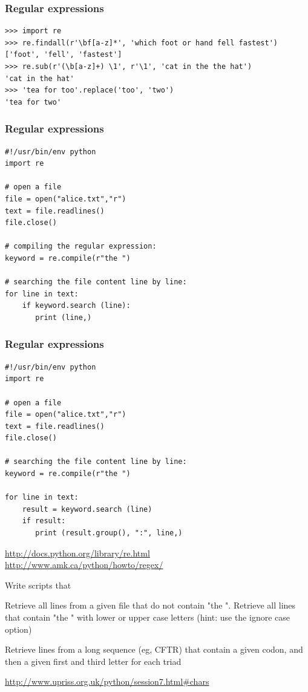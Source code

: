 \documentclass{beamer}
\begin{document}
\begin{frame}[containsverbatim]
\frametitle{Regular expressions}
\begin{lstlisting}
>>> import re
>>> re.findall(r'\bf[a-z]*', 'which foot or hand fell fastest')
['foot', 'fell', 'fastest']
>>> re.sub(r'(\b[a-z]+) \1', r'\1', 'cat in the the hat')
'cat in the hat'
>>> 'tea for too'.replace('too', 'two')
'tea for two'
\end{lstlisting}
\end{frame}


\begin{frame}[containsverbatim]
\frametitle{Regular expressions}
\begin{lstlisting}
#!/usr/bin/env python
import re

# open a file
file = open("alice.txt","r")
text = file.readlines()
file.close()

# compiling the regular expression:
keyword = re.compile(r"the ")

# searching the file content line by line:
for line in text:
    if keyword.search (line):
       print (line,)
\end{lstlisting}
\end{frame}

\begin{frame}[containsverbatim]
\frametitle{Regular expressions}
\begin{lstlisting}
#!/usr/bin/env python
import re

# open a file
file = open("alice.txt","r")
text = file.readlines()
file.close()

# searching the file content line by line:
keyword = re.compile(r"the ")

for line in text:
    result = keyword.search (line)
    if result:
       print (result.group(), ":", line,)
\end{lstlisting}
\url{http://docs.python.org/library/re.html}
\url{http://www.amk.ca/python/howto/regex/}
\end{frame}


\begin{frame}[containsverbatim]
Write scripts that
\begin{example}
Retrieve all lines from a given file that do not contain "the ". Retrieve all lines that contain "the " with lower or upper case letters (hint: use the ignore case option)
\end{example}
\begin{example}
Retrieve lines from a long sequence (eg, CFTR) that contain a given codon, and then a given first and third letter for each triad 
\end{example}
\url{http://www.upriss.org.uk/python/session7.html#chars}
\end{frame}
\end{document}
